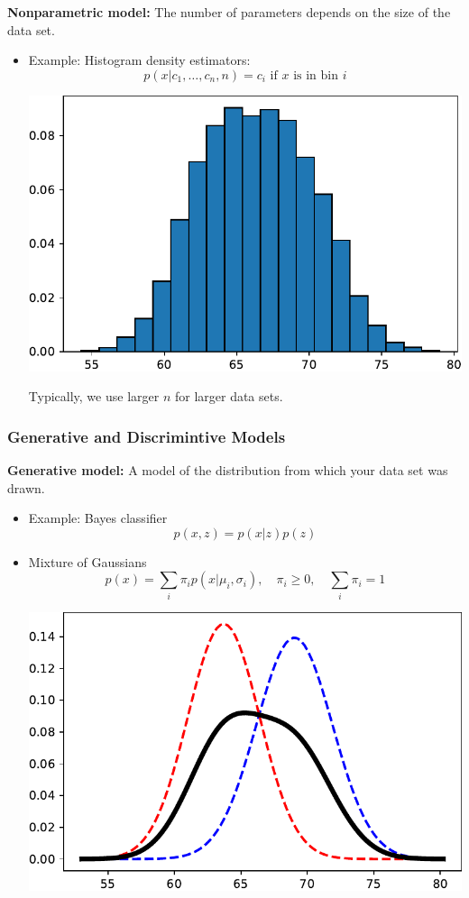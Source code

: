 \documentclass[xcolor={dvipsnames}]{beamer}
\begin{document}
\begin{frame}
    \setlength\parskip{0.75em}
    \textbf{Nonparametric model:} The number of parameters depends on the size of the data set.
    \begin{itemize}
        \item Example: Histogram density estimators:
        \[
            p(x|c_1,\ldots,c_n, n) = \text{$c_i$ if $x$ is in bin $i$}
        \]
        \begin{center}
        \includegraphics[scale=0.5]{hist.pdf}
        \end{center}
        Typically, we use larger $n$ for larger data sets.
    \end{itemize}
\end{frame}

\begin{frame}
    \frametitle{Generative and Discrimintive Models}
    \setlength\parskip{0.75em}
    \textbf{Generative model:} A model of the distribution from which your data set was drawn.
    \begin{itemize}
        \item Example: Bayes classifier
        \[
            p(x,z) = p(x|z)p(z)
        \]
        \item Mixture of Gaussians
        \[
            p(x) = \sum_i \pi_i p(x|\mu_i,\sigma_i),\quad \pi_i\geq 0,\quad \sum_i \pi_i=1
        \]
        \begin{center}
            \includegraphics[scale=0.4]{gmm.pdf}
        \end{center}
    \end{itemize}
\end{frame}
\end{document}
